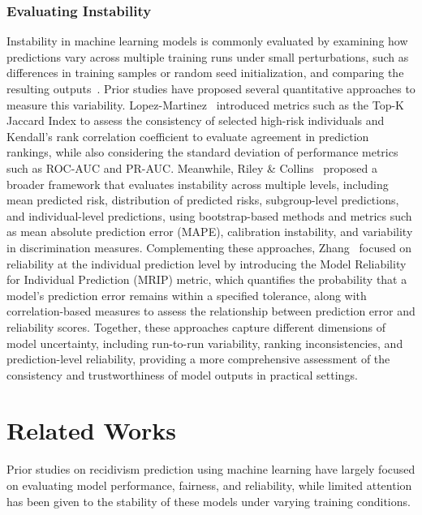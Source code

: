 \documentclass{article}
\begin{document}
\subsubsection*{Evaluating Instability} %
\tab%
Instability in machine learning models is commonly evaluated by examining how predictions vary across multiple training runs under small perturbations, such as differences in training samples or random seed initialization, and comparing the resulting outputs~\cite{riley2023stability,lopez2022instability}. Prior studies have proposed several quantitative approaches to measure this variability. Lopez-Martinez~\cite{lopez2022instability} introduced metrics such as the Top-K Jaccard Index to assess the consistency of selected high-risk individuals and Kendall's rank correlation coefficient to evaluate agreement in prediction rankings, while also considering the standard deviation of performance metrics such as ROC-AUC and PR-AUC. Meanwhile, Riley \& Collins~\cite{riley2023stability} proposed a broader framework that evaluates instability across multiple levels, including mean predicted risk, distribution of predicted risks, subgroup-level predictions, and individual-level predictions, using bootstrap-based methods and metrics such as mean absolute prediction error (MAPE), calibration instability, and variability in discrimination measures. Complementing these approaches, Zhang~\cite{zhang2024reliability} focused on reliability at the individual prediction level by introducing the Model Reliability for Individual Prediction (MRIP) metric, which quantifies the probability that a model's prediction error remains within a specified tolerance, along with correlation-based measures to assess the relationship between prediction error and reliability scores. Together, these approaches capture different dimensions of model uncertainty, including run-to-run variability, ranking inconsistencies, and prediction-level reliability, providing a more comprehensive assessment of the consistency and trustworthiness of model outputs in practical settings.

\section{Related Works}
\tab%
Prior studies on recidivism prediction using machine learning have largely focused on evaluating model performance, fairness, and reliability, while limited attention has been given to the stability of these models under varying training conditions.
\end{document}
